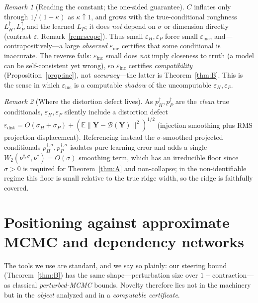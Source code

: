 \documentclass[11pt]{article}
\theoremstyle{plain}
\theoremstyle{definition}
\theoremstyle{remark}
\newtheorem{remark}{Remark}
\newcommand{\E}{\mathbb{E}}
\newcommand{\norm}[1]{\lVert #1 \rVert}
\newcommand{\einc}{\varepsilon_{\mathrm{inc}}}
\newcommand{\edist}{\varepsilon_{\mathrm{dist}}}
\begin{document}
\begin{remark}[Reading the constant; the one-sided guarantee]
\label{rem:incconst}
$C$ inflates only through $1/(1-\kappa)$ as $\kappa\uparrow1$, and grows with the true-conditional
roughness $L_H^\dagger,L_P^\dagger$ and the learned $L_P$; it does \emph{not} depend on $\sigma$ or
dimension directly (contrast $\varepsilon$, Remark~\ref{rem:scope}). Thus small $\varepsilon_H,
\varepsilon_P$ force small $\einc$, and---contrapositively---a large \emph{observed} $\einc$ certifies
that some conditional is inaccurate. The reverse fails: $\einc$ small does \emph{not} imply closeness to
truth (a model can be self-consistent yet wrong), so $\einc$ certifies \emph{compatibility}
(Proposition~\ref{prop:inc}), not \emph{accuracy}---the latter is Theorem~\ref{thm:B}. This is the
sense in which $\einc$ is a computable \emph{shadow} of the uncomputable $\varepsilon_H,\varepsilon_P$.
\end{remark}

\begin{remark}[Where the distortion defect lives]
\label{rem:edist}
As $p^\dagger_H,p^\dagger_P$ are the \emph{clean} true conditionals, $\varepsilon_H,\varepsilon_P$
silently include a distortion defect
$\edist=O(\sigma_H+\sigma_P)+(\E\norm{\bm Y-\mathcal B(\bm Y)}^2)^{1/2}$ (injection smoothing plus RMS
projection displacement). Referencing instead the $\sigma$-smoothed projected conditionals
$p^{\dagger,\sigma}_H,p^{\dagger,\sigma}_P$ isolates pure learning error and adds a single
$W_2(\nu^{\dagger,\sigma},\nu^\dagger)=O(\sigma)$ smoothing term, which has an irreducible floor since
$\sigma>0$ is required for Theorem~\ref{thm:A} and non-collapse; in the non-identifiable regime this
floor is small relative to the true ridge width, so the ridge is faithfully covered.
\end{remark}

\section{Positioning against approximate MCMC and dependency networks}
\label{sec:positioning}

The tools we use are standard, and we say so plainly: our steering bound (Theorem~\ref{thm:B}) has the
same shape---perturbation size over $1-\text{contraction}$---as classical \emph{perturbed-MCMC}
bounds. Novelty therefore lies not in the machinery but in the \emph{object} analyzed and in a
\emph{computable certificate}.
\end{document}

